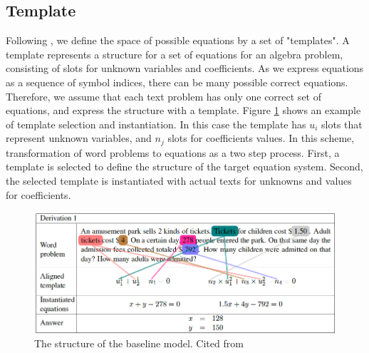 \documentclass[11pt,letterpaper]{article}
\begin{document}
\subsection{Template}
Following \cite{Kushman2014LearningTA}, we define the space of possible equations by a set of "templates". A template represents a structure for a set of equations for an algebra problem, consisting of slots for unknown variables and coefficients. As we express equations as a sequence of symbol indices, there can be many possible correct equations. Therefore, we assume that each text problem has only one correct set of equations, and express the structure with a template. Figure \ref{template} shows an example of template selection and instantiation. In this case the template has $u_i$ slots that represent unknown variables, and $n_j$ slots for coefficients values. In this scheme, transformation of word problems to equations as a two step process. First, a template is selected to define the structure of the target equation system. Second, the selected template is instantiated with actual texts for unknowns and values for coefficients. 
\begin{figure}[ht]
	\centering
	\includegraphics[bb=0 0 877 353, scale=0.5]{template.png}%
    \caption{The structure of the baseline model. Cited from \cite{Kushman2014LearningTA}}
    \label{template}
\end{figure}
\end{document}
